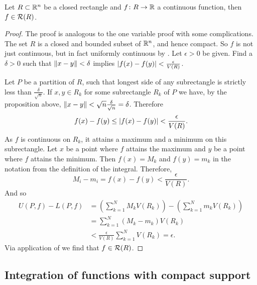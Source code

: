 \begin{thm} \label{mv:thm:contintrect}
Let $R \subset {\mathbb{R}}^n$ be a closed rectangle and
$f \colon R \to {\mathbb{R}}$ a continuous function,
then $f \in {\mathcal{R}}(R)$.
\end{thm}

\begin{proof}
The proof is analogous to the one variable proof with some complications.
The set $R$ is a closed and bounded subset of ${\mathbb{R}}^n$, and hence compact.  So
$f$ is not just continuous, but in fact uniformly continuous 
by .
Let $\epsilon > 0$ be given.  Find a $\delta > 0$ such that
$\lVert {x-y} \rVert < \delta$ implies $\lvert {f(x)-f(y)} \rvert < \frac{\epsilon}{V(R)}$.

Let $P$ be a partition of $R$, such that longest side of any subrectangle
is strictly less than $\frac{\delta}{\sqrt{n}}$.
If $x, y \in R_k$ for some subrectangle $R_k$ of $P$ we have,
by the proposition above,
$\lVert {x-y} \rVert < \sqrt{n} \frac{\delta}{\sqrt{n}} = \delta$.  Therefore
\begin{equation*}
f(x)-f(y) \leq \lvert {f(x)-f(y)} \rvert < \frac{\epsilon}{V(R)} .
\end{equation*}
As $f$ is continuous on $R_k$, it attains a maximum and a minimum
on this subrectangle.
Let $x$ be a point where $f$ attains the maximum and $y$ be a point
where $f$ attains the minimum.  Then $f(x) = M_k$
and $f(y) = m_k$ in the notation from the definition of the integral.
Therefore,
\begin{equation*}
M_i-m_i = f(x)-f(y) < 
\frac{\epsilon}{V(R)} .
\end{equation*}
And so
\begin{equation*}
\begin{split}
U(P,f) - L(P,f)
& =
\left(
\sum_{k=1}^N
M_k V(R_k)
\right)
-
\left(
\sum_{k=1}^N
m_k V(R_k)
\right)
\\
& =
\sum_{k=1}^N
(M_k-m_k) V(R_k)
\\
& <
\frac{\epsilon}{V(R)}
\sum_{k=1}^N
V(R_k)
= \epsilon.
\end{split}
\end{equation*}
Via application of  we find that $f \in
{\mathcal{R}}(R)$.
\end{proof}

\subsection{Integration of functions with compact support}

